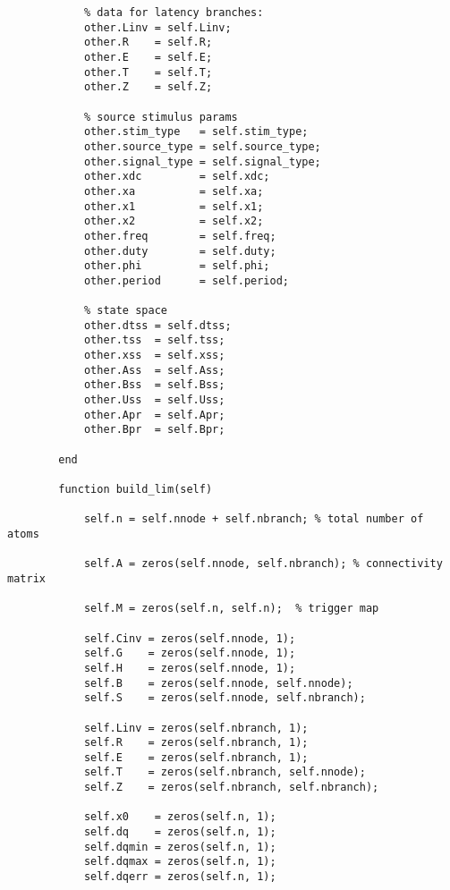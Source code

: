 \begin{lstlisting}
            % data for latency branches:
            other.Linv = self.Linv;
            other.R    = self.R;    
            other.E    = self.E;    
            other.T    = self.T;    
            other.Z    = self.Z;    
            
            % source stimulus params
            other.stim_type   = self.stim_type;
            other.source_type = self.source_type;
            other.signal_type = self.signal_type;
            other.xdc         = self.xdc;        
            other.xa          = self.xa;         
            other.x1          = self.x1;         
            other.x2          = self.x2;
            other.freq        = self.freq;       
            other.duty        = self.duty;       
            other.phi         = self.phi;        
            other.period      = self.period;     
            
            % state space
            other.dtss = self.dtss; 
            other.tss  = self.tss;  
            other.xss  = self.xss;  
            other.Ass  = self.Ass;  
            other.Bss  = self.Bss;  
            other.Uss  = self.Uss;  
            other.Apr  = self.Apr;  
            other.Bpr  = self.Bpr;  
            
        end
        
        function build_lim(self)
                        
            self.n = self.nnode + self.nbranch; % total number of atoms
            
            self.A = zeros(self.nnode, self.nbranch); % connectivity matrix
            
            self.M = zeros(self.n, self.n);  % trigger map

            self.Cinv = zeros(self.nnode, 1);
            self.G    = zeros(self.nnode, 1);
            self.H    = zeros(self.nnode, 1);
            self.B    = zeros(self.nnode, self.nnode);
            self.S    = zeros(self.nnode, self.nbranch);

            self.Linv = zeros(self.nbranch, 1); 
            self.R    = zeros(self.nbranch, 1);
            self.E    = zeros(self.nbranch, 1);
            self.T    = zeros(self.nbranch, self.nnode);
            self.Z    = zeros(self.nbranch, self.nbranch);
            
            self.x0    = zeros(self.n, 1);
            self.dq    = zeros(self.n, 1);
            self.dqmin = zeros(self.n, 1);
            self.dqmax = zeros(self.n, 1);
            self.dqerr = zeros(self.n, 1);
            

\end{lstlisting}
